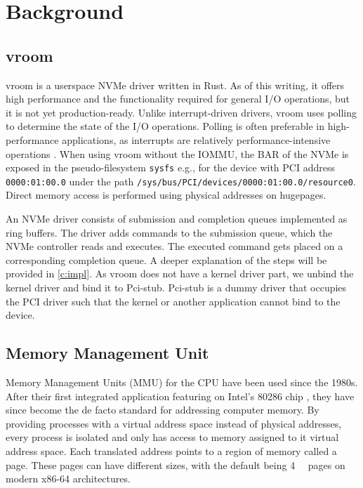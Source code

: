 \chapter{Background}

\section{vroom}
vroom is a userspace NVMe driver written in Rust. As of this writing, it offers high performance and the functionality required for general I/O operations, but it is not yet production-ready. Unlike interrupt-driven drivers, vroom uses polling to determine the state of the I/O operations. Polling is often preferable in high-performance applications, as interrupts are relatively performance-intensive operations \cite{spdksubmitting}.
When using vroom without the IOMMU, the BAR of the NVMe is exposed in the pseudo-filesystem \texttt{sysfs} e.g., for the device with PCI address \texttt{0000:01:00.0} under the path \texttt{/sys/bus/PCI/devices/0000:01:00.0/resource0}. Direct memory access is performed using physical addresses on hugepages.

An NVMe driver consists of submission and completion queues implemented as ring buffers. The driver adds commands to the submission queue, which the NVMe controller reads and executes. The executed command gets placed on a corresponding completion queue. A deeper explanation of the steps will be provided in \autoref{c:impl}.
As vroom does not have a kernel driver part, we unbind the kernel driver and bind it to Pci-stub. Pci-stub is a dummy driver that occupies the PCI driver such that the kernel or another application cannot bind to the device.

\section{Memory Management Unit}
Memory Management Units (MMU) for the CPU have been used since the 1980s. After their first integrated application featuring on Intel's 80286 chip \cite{intel80286}, they have since become the de facto standard for addressing computer memory. By providing processes with a virtual address space instead of physical addresses, every process is isolated and only has access to memory assigned to it virtual address space. Each translated address points to a region of memory called a page. These pages can have different sizes, with the default being \qty{4}{\kibi\byte} pages on modern x86-64 architectures.

